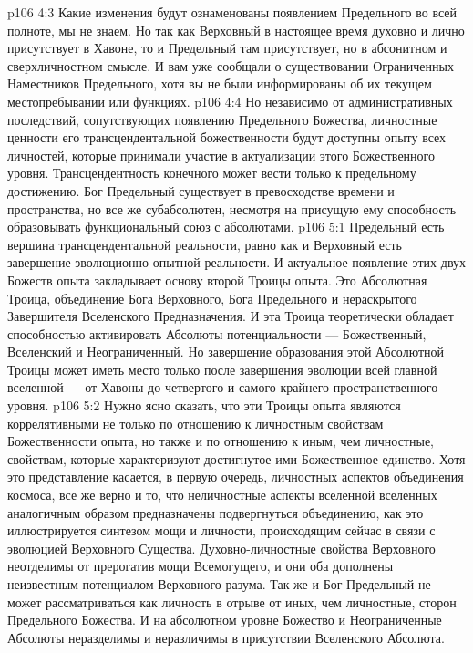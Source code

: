 \vs p106 4:3 Какие изменения будут ознаменованы появлением Предельного во всей полноте, мы не знаем. Но так как Верховный в настоящее время духовно и лично присутствует в Хавоне, то и Предельный там присутствует, но в абсонитном и сверхличностном смысле. И вам уже сообщали о существовании Ограниченных Наместников Предельного, хотя вы не были информированы об их текущем местопребывании или функциях.
\vs p106 4:4 Но независимо от административных последствий, сопутствующих появлению Предельного Божества, личностные ценности его трансцендентальной божественности будут доступны опыту всех личностей, которые принимали участие в актуализации этого Божественного уровня. Трансцендентность конечного может вести только к предельному достижению. Бог Предельный существует в превосходстве времени и пространства, но все же субабсолютен, несмотря на присущую ему способность образовывать функциональный союз с абсолютами.
\vs p106 5:1 Предельный есть вершина трансцендентальной реальности, равно как и Верховный есть завершение эволюционно\hyp{}опытной реальности. И актуальное появление этих двух Божеств опыта закладывает основу второй Троицы опыта. Это Абсолютная Троица, объединение Бога Верховного, Бога Предельного и нераскрытого Завершителя Вселенского Предназначения. И эта Троица теоретически обладает способностью активировать Абсолюты потенциальности --- Божественный, Вселенский и Неограниченный. Но завершение образования этой Абсолютной Троицы может иметь место только после завершения эволюции всей главной вселенной --- от Хавоны до четвертого и самого крайнего пространственного уровня.
\vs p106 5:2 Нужно ясно сказать, что эти Троицы опыта являются коррелятивными не только по отношению к личностным свойствам Божественности опыта, но также и по отношению к иным, чем личностные, свойствам, которые характеризуют достигнутое ими Божественное единство. Хотя это представление касается, в первую очередь, личностных аспектов объединения космоса, все же верно и то, что неличностные аспекты вселенной вселенных аналогичным образом предназначены подвергнуться объединению, как это иллюстрируется синтезом мощи и личности, происходящим сейчас в связи с эволюцией Верховного Существа. Духовно\hyp{}личностные свойства Верховного неотделимы от прерогатив мощи Всемогущего, и они оба дополнены неизвестным потенциалом Верховного разума. Так же и Бог Предельный не может рассматриваться как личность в отрыве от иных, чем личностные, сторон Предельного Божества. И на абсолютном уровне Божество и Неограниченные Абсолюты неразделимы и неразличимы в присутствии Вселенского Абсолюта.
